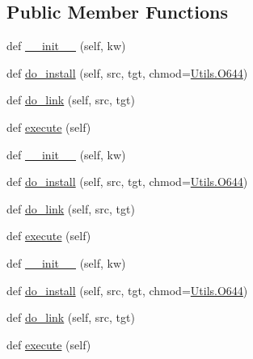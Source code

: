 \subsection*{Public Member Functions}
\begin{DoxyCompactItemize}
\item 
def \hyperlink{classwaflib_1_1_build_1_1_uninstall_context_a4f1168ab484b0e1d748fefb5a6812b85}{\+\_\+\+\_\+init\+\_\+\+\_\+} (self, kw)
\item 
def \hyperlink{classwaflib_1_1_build_1_1_uninstall_context_a4b583a30eee0f110ab2b9b833aa00dd0}{do\+\_\+install} (self, src, tgt, chmod=\hyperlink{namespacewaflib_1_1_utils_ade9dd27fadbf52a0641bbff06d3dd3ac}{Utils.\+O644})
\item 
def \hyperlink{classwaflib_1_1_build_1_1_uninstall_context_a46252a8c474b628ac19e035c124f9e6b}{do\+\_\+link} (self, src, tgt)
\item 
def \hyperlink{classwaflib_1_1_build_1_1_uninstall_context_aadc84a51026ff5d9971566f29a0faaa8}{execute} (self)
\item 
def \hyperlink{classwaflib_1_1_build_1_1_uninstall_context_a4f1168ab484b0e1d748fefb5a6812b85}{\+\_\+\+\_\+init\+\_\+\+\_\+} (self, kw)
\item 
def \hyperlink{classwaflib_1_1_build_1_1_uninstall_context_a4b583a30eee0f110ab2b9b833aa00dd0}{do\+\_\+install} (self, src, tgt, chmod=\hyperlink{namespacewaflib_1_1_utils_ade9dd27fadbf52a0641bbff06d3dd3ac}{Utils.\+O644})
\item 
def \hyperlink{classwaflib_1_1_build_1_1_uninstall_context_a46252a8c474b628ac19e035c124f9e6b}{do\+\_\+link} (self, src, tgt)
\item 
def \hyperlink{classwaflib_1_1_build_1_1_uninstall_context_aadc84a51026ff5d9971566f29a0faaa8}{execute} (self)
\item 
def \hyperlink{classwaflib_1_1_build_1_1_uninstall_context_a4f1168ab484b0e1d748fefb5a6812b85}{\+\_\+\+\_\+init\+\_\+\+\_\+} (self, kw)
\item 
def \hyperlink{classwaflib_1_1_build_1_1_uninstall_context_a4b583a30eee0f110ab2b9b833aa00dd0}{do\+\_\+install} (self, src, tgt, chmod=\hyperlink{namespacewaflib_1_1_utils_ade9dd27fadbf52a0641bbff06d3dd3ac}{Utils.\+O644})
\item 
def \hyperlink{classwaflib_1_1_build_1_1_uninstall_context_a46252a8c474b628ac19e035c124f9e6b}{do\+\_\+link} (self, src, tgt)
\item 
def \hyperlink{classwaflib_1_1_build_1_1_uninstall_context_aadc84a51026ff5d9971566f29a0faaa8}{execute} (self)

\end{DoxyCompactItemize}
